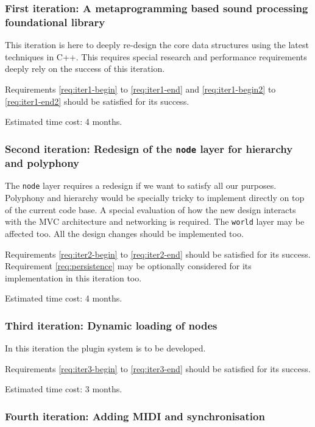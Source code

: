 \subsubsection{First iteration: A metaprogramming based sound
  processing foundational library}

This iteration is here to deeply re-design the core data structures
using the latest techniques in C++. This requires special research and
performance requirements deeply rely on the success of this
iteration. 

Requirements \ref{req:iter1-begin} to \ref{req:iter1-end} and
\ref{req:iter1-begin2} to \ref{req:iter1-end2} should be satisfied for
its success.

Estimated time cost: 4 months.

\subsubsection{Second iteration: Redesign of the \texttt{node} layer
  for hierarchy and polyphony}

The \texttt{node} layer requires a redesign if we want to satisfy all
our purposes. Polyphony and hierarchy would be specially tricky to
implement directly on top of the current code base. A special
evaluation of how the new design interacts with the MVC architecture
and networking is required. The \texttt{world} layer may be affected
too. All the design changes should be implemented too.

Requirements \ref{req:iter2-begin} to \ref{req:iter2-end} should be
satisfied for its success. Requirement \ref{req:persistence} may be
optionally considered for its implementation in this iteration too.

Estimated time cost: 4 months.

\subsubsection{Third iteration: Dynamic loading of nodes}

In this iteration the plugin system is to be developed.

Requirements \ref{req:iter3-begin} to \ref{req:iter3-end} should be
satisfied for its success.

Estimated time cost: 3 months.

\subsubsection{Fourth iteration: Adding MIDI and synchronisation}

